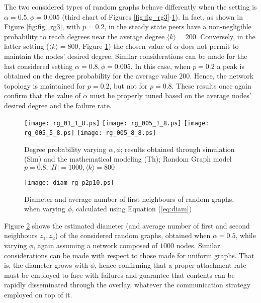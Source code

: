\documentclass[a4paper,twosided]{article}
\begin{document}
The two considered types of random graphs behave differently when the setting is $\alpha =0.5, \phi=0.005$ (third chart of Figures \ref{fig:fig_rg3}-\ref{fig:fig_rg4}). In fact, as shown in Figure \ref{fig:fig_rg3}, with $p=0.2$, in the steady state peers have a non-negligible probability to reach degrees near the average degree $\langle k \rangle=200$. Conversely, in the latter setting ($\langle k \rangle=800$, Figure \ref{fig:fig_rg4}) the chosen value of $\alpha$ does not permit to maintain the nodes' desired degree. Similar considerations can be made for the last considered setting $\alpha =0.8, \phi=0.005$. In this case, when $p=0.2$ a peak is obtained on the degree probability for the average value $200$. Hence, the network topology is maintained for $p=0.2$, but not for $p=0.8$.
These results once again confirm that the value of $\alpha$ must be properly tuned based on the average nodes' desired degree and the failure rate.


\begin{figure}
   \centering
   \texttt{[image: rg\_01\_1\_8.ps]}
   \texttt{[image: rg\_005\_1\_8.ps]}
   \texttt{[image: rg\_005\_5\_8.ps]}
   \texttt{[image: rg\_005\_8\_8.ps]}
   \caption{Degree probability varying $\alpha, \phi$; results obtained through simulation (Sim) and the mathematical modeling (Th); Random Graph model $p=0.8, |\Pi|=1000, \langle k \rangle = 800$}   
   \label{fig:fig_rg4}
\end{figure}



\begin{figure}
   \centering
   \texttt{[image: diam\_rg\_p2p10.ps]}
   \caption{Diameter and average number of first neighbours of random graphs, when varying $\phi$, calculated using Equation (\ref{eq:diam})}
   \label{fig:diam_rg}
\end{figure}

Figure \ref{fig:diam_rg} shows the estimated diameter (and average number of first  and second neighbours $z_1, z_2$) of the considered random graphs, obtained when $\alpha=0.5$, while varying $\phi$, again assuming a network composed of $1000$ nodes. 
Similar considerations can be made with respect to those made for uniform graphs. 
That is, the diameter grows with $\phi$, hence confirming that a proper attachment rate must be employed to face with failures and guarantee that contents can be rapidly disseminated through the overlay, whatever the communication strategy employed on top of it.
\end{document}
